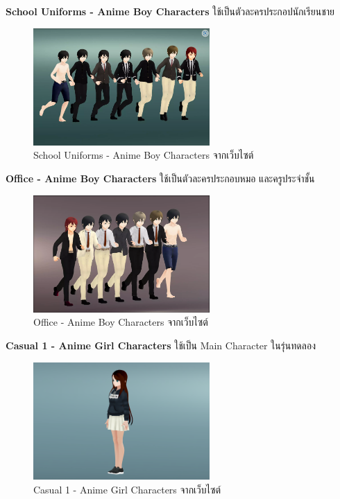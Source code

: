 \subsubitem \textbf{School Uniforms - Anime Boy Characters} \cite{School-Uniforms-Anime-Boy-Characters:asset} ใช้เป็นตัวละครประกอปนักเรียนชาย
\begin{figure}[h]
  \centering
  \includegraphics[width=0.6\textwidth, height=0.2\textheight]{Images/School Uniforms - Anime Boy Characters.png}
  \caption{School Uniforms - Anime Boy Characters จากเว็บไซต์} \label{School Uniforms - Anime Boy Characters}
\end{figure} 


\subsubitem \textbf{Office - Anime Boy Characters} \cite{Office-Anime-Boy-Characters:asset} ใช้เป็นตัวละครประกอบหมอ และครูประจำชั้น
\begin{figure}
  \centering
  \includegraphics[width=0.6\textwidth, height=0.2\textheight]{Images/Office - Anime Boy Characters.png}
  \caption{Office - Anime Boy Characters จากเว็บไซต์} \label{Office - Anime Boy Characters}
\end{figure}


\subsubitem \textbf{Casual 1 - Anime Girl Characters} \cite{anime-girl:asset} ใช้เป็น Main Character ในรุ่นทดลอง
\begin{figure}[h]
  \centering
  \includegraphics[width=0.6\textwidth, height=0.2\textheight]{Images/7c8d1857-1f28-440d-a966-2c09fe1db214_orig.png}
  \caption{Casual 1 - Anime Girl Characters จากเว็บไซต์}\label{AnimeGirl}
\end{figure}

